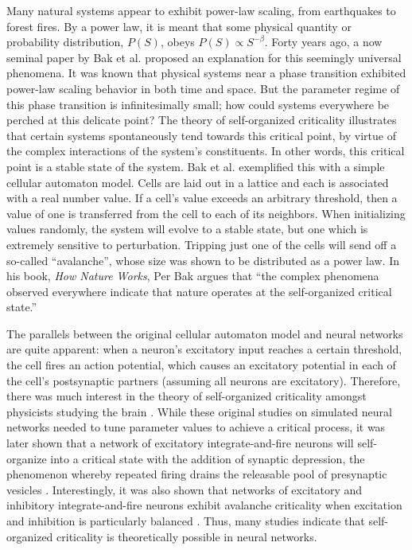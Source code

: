 Many natural systems appear to exhibit power-law scaling, from earthquakes to forest fires. By a power law, it is meant that some physical quantity or probability distribution, $P(S)$, obeys $P(S)\propto S^{-\beta}$. Forty years ago, a now seminal paper by Bak et al. \cite{Bak1987} proposed an explanation for this seemingly universal phenomena. It was known that physical systems near a phase transition exhibited power-law scaling behavior in both time and space. But the parameter regime of this phase transition is infinitesimally small; how could systems everywhere be perched at this delicate point? The theory of self-organized criticality illustrates that certain systems spontaneously tend towards this critical point, by virtue of the complex interactions of the system’s constituents. In other words, this critical point is a stable state of the system. Bak et al. exemplified this with a simple cellular automaton model. Cells are laid out in a lattice and each is associated with a real number value. If a cell’s value exceeds an arbitrary threshold, then a value of one is transferred from the cell to each of its neighbors. When initializing values randomly, the system will evolve to a stable state, but one which is extremely sensitive to perturbation. Tripping just one of the cells will send off a so-called “avalanche”, whose size was shown to be distributed as a power law. In his book, \textit{How Nature Works}\cite{Bak1996}, Per Bak argues that “the complex phenomena observed everywhere indicate that nature operates at the self-organized critical state.”

The parallels between the original cellular automaton model and neural networks are quite apparent: when a neuron’s excitatory input reaches a certain threshold, the cell fires an action potential, which causes an excitatory potential in each of the cell’s postsynaptic partners (assuming all neurons are excitatory). Therefore, there was much interest in the theory of self-organized criticality amongst physicists studying the brain \cite{Corral1995, Herz1995}. While these original studies on simulated neural networks needed to tune parameter values to achieve a critical process, it was later shown \cite{Levina2007} that a network of excitatory integrate-and-fire neurons will self-organize into a critical state with the addition of synaptic depression, the phenomenon whereby repeated firing drains the releasable pool of presynaptic vesicles \cite{Markram1996, Regehr2012}. Interestingly, it was also shown that networks of excitatory and inhibitory integrate-and-fire neurons exhibit avalanche criticality when excitation and inhibition is particularly balanced \cite{Poil2012, Lombardi2017}. Thus, many studies indicate that self-organized criticality is theoretically possible in neural networks.

